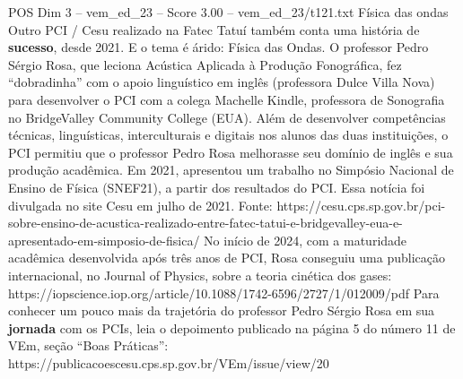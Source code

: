 \begin{textsample}{POS Dim 3 – vem\_ed\_23 – Score 3.00 – vem\_ed\_23/t121.txt}  \label{ex:f3_pos_101}
Física das ondas Outro PCI / Cesu realizado na Fatec Tatuí também conta uma história de \textbf{sucesso}, desde 2021.
E o tema é árido: Física das Ondas.
O professor Pedro Sérgio Rosa, que leciona Acústica Aplicada à Produção Fonográfica, fez “dobradinha” com o apoio linguístico em inglês (professora Dulce Villa Nova) para desenvolver o PCI com a colega Machelle Kindle, professora de Sonografia no BridgeValley Community College (EUA).
Além de desenvolver competências técnicas, linguísticas, interculturais e digitais nos alunos das duas instituições, o PCI permitiu que o professor Pedro Rosa melhorasse seu domínio de inglês e sua produção acadêmica.
Em 2021, apresentou um trabalho no Simpósio Nacional de Ensino de Física (SNEF21), a partir dos resultados do PCI.
Essa notícia foi divulgada no site Cesu em julho de 2021.
Fonte: https://cesu.cps.sp.gov.br/pci-sobre-ensino-de-acustica-realizado-entre-fatec-tatui-e-bridgevalley-eua-e-apresentado-em-simposio-de-fisica/ No início de 2024, com a maturidade acadêmica desenvolvida após três anos de PCI, Rosa conseguiu uma publicação internacional, no Journal of Physics, sobre a teoria cinética dos gases: https://iopscience.iop.org/article/10.1088/1742-6596/2727/1/012009/pdf Para conhecer um pouco mais da trajetória do professor Pedro Sérgio Rosa em sua \textbf{jornada} com os PCIs, leia o depoimento publicado na página 5 do número 11 de VEm, seção “Boas Práticas”: https://publicacoescesu.cps.sp.gov.br/VEm/issue/view/20

\end{textsample}
